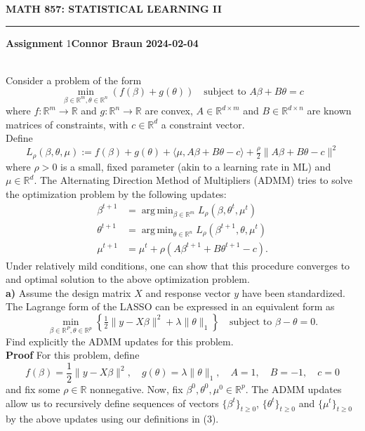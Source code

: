 \documentclass[10pt]{article}
\newcommand{\mbb}[1]{\mathbb{#1}}
\newcommand{\1}[1]{\mathbbm{1}_{#1}}
\DeclareMathOperator{\argmin}{arg\,min}
\begin{document}
    \begin{center}
        {\bf\large{MATH 857: STATISTICAL LEARNING II}}
        \smallskip
        \hrule
        \smallskip
        {\bf Assignment} 1\hfill {\bf Connor Braun} \hfill {\bf 2024-02-04}
    \end{center}
    \\[5pt]
    Consider a problem of the form 
    \[\min_{\beta\in\mbb{R}^m,\theta\in\mbb{R}^n}(f(\beta)+g(\theta))\quad\text{subject to $A\beta+B\theta=c$}\]
    where $f:\mbb{R}^m\rightarrow\mbb{R}$ and $g:\mbb{R}^n\rightarrow\mbb{R}$ are convex, $A\in\mbb{R}^{d\times m}$ and $B\in\mbb{R}^{d\times n}$ are known matrices
    of constraints, with $c\in\mbb{R}^d$ a constraint vector.\\[5pt]
    Define
    \[L_\rho(\beta,\theta,\mu):=f(\beta)+g(\theta)+\langle\mu, A\beta+B\theta-c\rangle+\tfrac{\rho}{2}\|A\beta+B\theta-c\|^2\]
    where $\rho>0$ is a small, fixed parameter (akin to a learning rate in ML) and $\mu\in\mbb{R}^d$. The Alternating Direction Method of Multipliers (ADMM)
    tries to solve the optimization problem by the following updates:
    \begin{align*}
        \beta^{t+1}&=\argmin_{\beta\in\mbb{R}^m} L_\rho(\beta,\theta^t,\mu^t)\\
        \theta^{t+1}&=\argmin_{\theta\in\mbb{R}^n} L_\rho(\beta^{t+1},\theta,\mu^t)\\
        \mu^{t+1}&=\mu^t+\rho(A\beta^{t+1}+B\theta^{t+1}-c).
    \end{align*}
    Under relatively mild conditions, one can show that this procedure converges to and optimal solution to the above optimization problem.\\[5pt]
    {\bf a)}\hspace{5pt} Assume the design matrix $X$ and response vector $y$ have been standardized. The Lagrange form of the LASSO can be expressed in an equivalent form as
    \[\min_{\beta\in\mbb{R}^P,\theta\in\mbb{R}^p}\left\{\tfrac{1}{2}\|y-X\beta\|^2+\lambda\|\theta\|_1\right\}\quad\text{subject to $\beta-\theta=0$}.\]
    Find explicitly the ADMM updates for this problem.\\[5pt]
    {\bf Proof}\hspace{5pt} For this problem, define
    \[f(\beta)=\frac{1}{2}\|y-X\beta\|^2,\quad g(\theta)=\lambda\|\theta\|_1,\quad A=1,\quad B=-1,\quad c=0\tag{3}\]
    and fix some $\rho\in\mbb{R}$ nonnegative. Now, fix $\beta^0,\theta^0,\mu^0\in\mbb{R}^p$. The ADMM updates allow us to recursively
    define sequences of vectors $\{\beta^t\}_{t\geq 0}$, $\{\theta^t\}_{t\geq 0}$ and $\{\mu^t\}_{t\geq 0}$ by the above updates using our definitions in (3).
\end{document}

